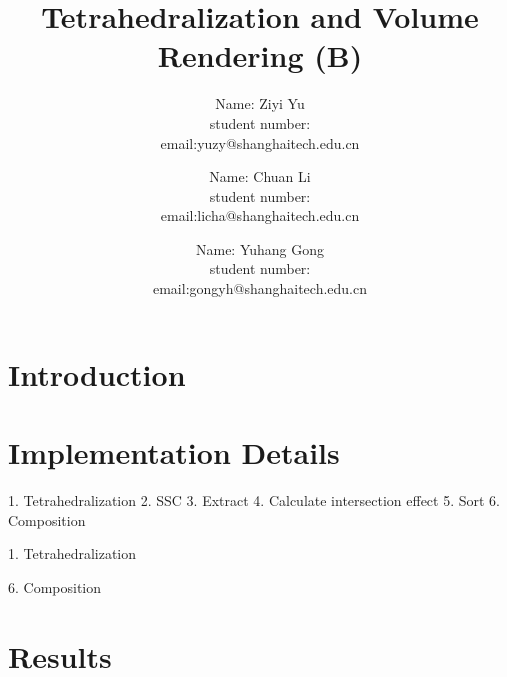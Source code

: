 \documentclass[acmtog]{acmart}
\title{Tetrahedralization and Volume Rendering (B)}
\author{Name: Ziyi Yu   \\ student number:\quad 123456789
	\\email:\quad yuzy@shanghaitech.edu.cn}
\author{Name: Chuan Li   \\ student number:\quad 123456789
	\\email:\quad licha@shanghaitech.edu.cn}
\author{Name: Yuhang Gong  \\ student number:\quad 2018533180
	\\email:\quad gongyh@shanghaitech.edu.cn}
\begin{document}
\maketitle

\vspace*{2 ex}


\section{Introduction}


\section{Implementation Details}
1. Tetrahedralization
2. SSC
3. Extract
4. Calculate intersection effect
5. Sort
6. Composition

1. Tetrahedralization



6. Composition




\section{Results}
\end{document}
